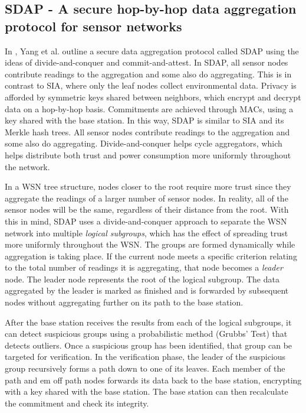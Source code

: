 \documentclass[a4paper]{article}
\begin{document}
\subsection{SDAP - A secure hop-by-hop data aggregation protocol for sensor networks}

In \cite{SDAP}, Yang et al. outline a secure data aggregation protocol called
SDAP using the ideas of divide-and-conquer and commit-and-attest. In SDAP, all
sensor nodes contribute readings to the aggregation and some also do
aggregating. This is in contrast to SIA, where only the leaf nodes collect
environmental data. Privacy is afforded by symmetric keys shared between
neighbors, which encrypt and decrypt data on a hop-by-hop basis. Commitments
are achieved through MACs, using a key shared with the base station. In this
way, SDAP is similar to SIA and its Merkle hash trees. All sensor nodes
contribute readings to the aggregation and some also do
aggregating. Divide-and-conquer helps cycle aggregators, which helps
distribute both trust and power consumption more uniformly throughout the
network.

In a WSN tree structure, nodes closer to the root require more trust since
they aggregate the readings of a larger number of sensor nodes. In reality,
all of the sensor nodes will be the same, regardless of their distance from
the root. With this in mind, SDAP uses a divide-and-conquer approach to
separate the WSN network into multiple {\em logical subgroups}, which has the
effect of spreading trust more uniformly throughout the WSN. The groups are
formed dynamically while aggregation is taking place. If the current node
meets a specific criterion relating to the total number of readings it is
aggregating, that node becomes a {\em leader} node. The leader node represents
the root of the logical subgroup. The data aggregated by the leader is marked
as finished and is forwarded by subsequent nodes without aggregating further
on its path to the base station.

After the base station receives the results from each of the logical
subgroups, it can detect suspicious groups using a probabilistic method
(Grubbs' Test) \cite{Grubb} that detects outliers. Once a suspicious group has
been identified, that group can be targeted for verification. In the
verification phase, the leader of the suspicious group recursively forms a
path down to one of its leaves. Each member of the path and {em off path
  nodes} forwards its data back to the base station, encrypting with a key
shared with the base station. The base station can then recalculate the
commitment and check its integrity.
\end{document}

